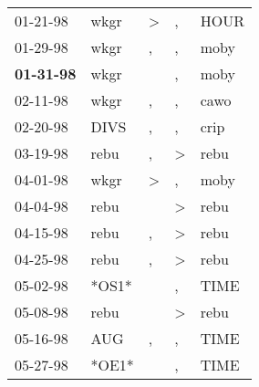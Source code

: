 \begin{supertabular}{p{0.07\textwidth}p{0.06\textwidth}p{0.02\textwidth}p{0.02\textwidth}p{0.06\textwidth}}
          01-21-98\textsuperscript{} &           wkgr\textsuperscript{} &     \textgreater &                , &           HOUR\textsuperscript{} \\
          01-29-98\textsuperscript{} &           wkgr\textsuperscript{} &                , &                , &           moby\textsuperscript{} \\
 \textbf{01-31-98\textsuperscript{}} &           wkgr\textsuperscript{} &                  &                , &           moby\textsuperscript{} \\
          02-11-98\textsuperscript{} &           wkgr\textsuperscript{} &                , &                , &           cawo\textsuperscript{} \\
          02-20-98\textsuperscript{} &           DIVS\textsuperscript{} &                , &                , &           crip\textsuperscript{} \\
          03-19-98\textsuperscript{} &           rebu\textsuperscript{} &                , &     \textgreater &           rebu\textsuperscript{} \\
          04-01-98\textsuperscript{} &           wkgr\textsuperscript{} &     \textgreater &                , &           moby\textsuperscript{} \\
          04-04-98\textsuperscript{} &           rebu\textsuperscript{} &                  &     \textgreater &           rebu\textsuperscript{} \\
          04-15-98\textsuperscript{} &           rebu\textsuperscript{} &                , &     \textgreater &           rebu\textsuperscript{} \\
          04-25-98\textsuperscript{} &           rebu\textsuperscript{} &                , &     \textgreater &           rebu\textsuperscript{} \\
          05-02-98\textsuperscript{} &                            *OS1* &                  &                , &           TIME\textsuperscript{} \\
          05-08-98\textsuperscript{} &           rebu\textsuperscript{} &                  &     \textgreater &           rebu\textsuperscript{} \\
          05-16-98\textsuperscript{} &            AUG\textsuperscript{} &                , &                , &           TIME\textsuperscript{} \\
          05-27-98\textsuperscript{} &                            *OE1* &                  &                , &           TIME\textsuperscript{} \\

\end{supertabular}
